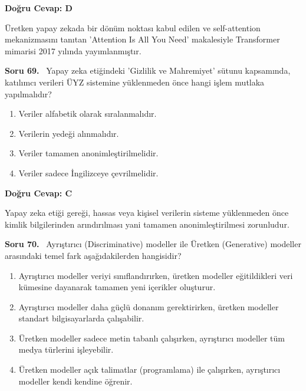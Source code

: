 \documentclass[11pt,a4paper,openany]{book}
\begin{document}
\vspace{4pt}
\begin{tcolorbox}[title=Cevap ve Açıklama, colback=gray!3!white, colframe=primarycolor!90!black, arc=2mm, fonttitle=\bfseries\sffamily, top=6pt, bottom=6pt]
    \textbf{Doğru Cevap: D}

    \vspace{2pt}
    Üretken yapay zekada bir dönüm noktası kabul edilen ve self-attention mekanizmasını tanıtan 'Attention Is All You Need' makalesiyle Transformer mimarisi 2017 yılında yayımlanmıştır.
\end{tcolorbox}
\vspace{10pt}
\needspace{5cm}
\vspace{8pt}
\noindent\textbf{\large\sffamily Soru 69.} \ Yapay zeka etiğindeki 'Gizlilik ve Mahremiyet' sütunu kapsamında, katılımcı verileri ÜYZ sistemine yüklenmeden önce hangi işlem mutlaka yapılmalıdır?

\begin{enumerate}[label=\Alph*), leftmargin=25pt, topsep=4pt, itemsep=2pt]
        \item Veriler alfabetik olarak sıralanmalıdır.
        \item Verilerin yedeği alınmalıdır.
        \item Veriler tamamen anonimleştirilmelidir.
        \item Veriler sadece İngilizceye çevrilmelidir.
\end{enumerate}

\vspace{4pt}
\begin{tcolorbox}[title=Cevap ve Açıklama, colback=gray!3!white, colframe=primarycolor!90!black, arc=2mm, fonttitle=\bfseries\sffamily, top=6pt, bottom=6pt]
    \textbf{Doğru Cevap: C}

    \vspace{2pt}
    Yapay zeka etiği gereği, hassas veya kişisel verilerin sisteme yüklenmeden önce kimlik bilgilerinden arındırılması yani tamamen anonimleştirilmesi zorunludur.
\end{tcolorbox}
\vspace{10pt}
\needspace{5cm}
\vspace{8pt}
\noindent\textbf{\large\sffamily Soru 70.} \ Ayrıştırıcı (Discriminative) modeller ile Üretken (Generative) modeller arasındaki temel fark aşağıdakilerden hangisidir?

\begin{enumerate}[label=\Alph*), leftmargin=25pt, topsep=4pt, itemsep=2pt]
        \item Ayrıştırıcı modeller veriyi sınıflandırırken, üretken modeller eğitildikleri veri kümesine dayanarak tamamen yeni içerikler oluşturur.
        \item Ayrıştırıcı modeller daha güçlü donanım gerektirirken, üretken modeller standart bilgisayarlarda çalışabilir.
        \item Üretken modeller sadece metin tabanlı çalışırken, ayrıştırıcı modeller tüm medya türlerini işleyebilir.
        \item Üretken modeller açık talimatlar (programlama) ile çalışırken, ayrıştırıcı modeller kendi kendine öğrenir.
\end{enumerate}
\end{document}
